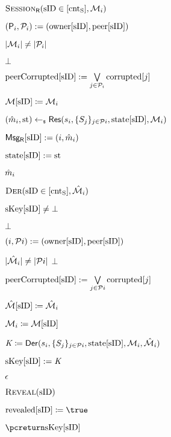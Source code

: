 \begin{figure}[h!]
{{\begin{minipage}[t]{7.5cm}
				\underline{$\GakeResO(\sID \in [\cntS], \GakeIniMesSet[{i}] )$} 
				\begin{nicodemus}
					\item $(\GIni,\PartySet_{i}) := (\owner[\sID],\peer[\sID])$
					\item \pcif $|\GakeIniMesSet[{i}]| \neq |\PartySet_{i}|$ 
					\item \quad  \pcreturn $\bot$ 
					\item $\peercorrupted[\sID] := \bigvee\limits_{ j \in \PartySet_{i}} \corrupted[j]$
					\item $\GIniMesSet[\sID] \coloneqq  \GakeIniMesSet[{i}]$ \label{line:gake-problem-a}
					\item $(\GakeResMes_{i}, \Gstate) \getsr \GakeRes(\GakeSk[i], \{\GakePk[j]\}_{j \in \PartySet{i}}, \Gstates[\GakeResUsID], \GakeIniMesSet[{i}])$
					\item $\GResMes[\sID]:=({i},\GakeResMes_{i})$
					\item $\Gstates[\sID]:= \Gstate$
					\item \pcreturn $\GakeResMes_{i}$ 
				\end{nicodemus}
			\end{minipage}
			\begin{minipage}[t]{7cm}
				\underline{$\GakeDerO(\GakeResUsID \in [\cntS],  \GakeResMesSet[{i}])$} 
				\begin{nicodemus}
					\item \pcif $\skeys[\GakeResUsID] \neq \bot$  
					\item \quad \pcreturn $\bot$
					\item $({i},\PartySet{i}) := (\owner[\GakeResUsID],\peer[\GakeResUsID])$
					\item \pcif $|\GakeResMesSet[{i}]| \neq |\PartySet{i}|$ \pcreturn $\bot$
					\item $\peercorrupted[\sID] := \bigvee\limits_{ j \in \PartySet{i}} \corrupted[j]$
					\item $\GResMesSet[\sID] \coloneqq \GakeResMesSet[{i}]$ \label{line:gake-problem-b}
					\item $\GakeIniMesSet[{i}] \coloneqq \GIniMesSet[\sID]$
					\item $\GakeSessKey \coloneqq \GakeDer(\GakeSk[{i}], \{\GakePk[j]\}_{j \in \PartySet{i}}, \Gstates[\GakeResUsID], \GakeIniMesSet[{i}], \GakeResMesSet[{i}])$
					\item $\skeys[\GakeResUsID] :=  \GakeSessKey$
					\item \pcreturn $\emptystr$\\
				\end{nicodemus}
				\underline{$\RevealO(\sID)$}
				\begin{nicodemus}
					\item $\revealed[\sID] \coloneqq \true$
					\item $\pcreturn \skeys[\sID]$	\\	
				\end{nicodemus}
				

\end{minipage}}}
\end{figure}
